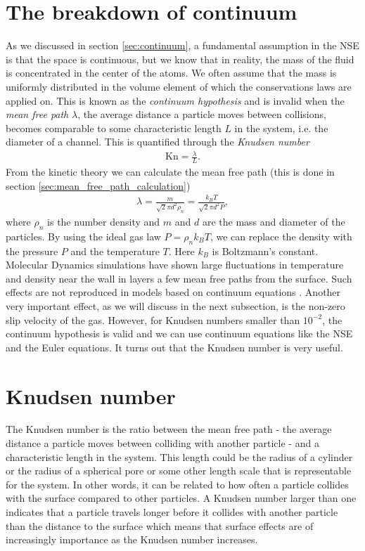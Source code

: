 \section{The breakdown of continuum}
\label{sec:continuum_breakdown}
As we discussed in section \ref{sec:continuum}, a fundamental assumption in the NSE is that the space is continuous, but we know that in reality, the mass of the fluid is concentrated in the center of the atoms. We often assume that the mass is uniformly distributed in the volume element of which the conservations laws are applied on. This is known as the \textit{continuum hypothesis} and is invalid when the \textit{mean free path} $\lambda$, the average distance a particle moves between collisions, becomes comparable to some characteristic length $L$ in the system, i.e. the diameter of a channel\cite{karniadakis2005microflows}. This is quantified through the \textit{Knudsen number}
\begin{align}
	\text{Kn} = \frac{\lambda}{L}.
\end{align}
From the kinetic theory we can calculate the mean free path (this is done in section \ref{sec:mean_free_path_calculation})
\begin{align}
	\lambda = \frac{m}{\sqrt 2 \pi d^2 \rho_n} = \frac{k_B T}{\sqrt 2 \pi d^2 P},
\end{align}
where $\rho_n$ is the number density and $m$ and $d$ are the mass and diameter of the particles. By using the ideal gas law $P = \rho_n k_BT$, we can replace the density with the pressure $P$ and the temperature $T$. Here $k_B$ is Boltzmann's constant. Molecular Dynamics simulations have shown large fluctuations in temperature and density near the wall in layers a few mean free paths from the surface. Such effects are not reproduced in models based on continuum equations \cite{karniadakis2005microflows}. Another very important effect, as we will discuss in the next subsection, is the non-zero slip velocity of the gas. However, for Knudsen numbers smaller than $10^{-2}$, the continuum hypothesis is valid and we can use continuum equations like the NSE and the Euler equations. It turns out that the Knudsen number is very useful.

\section{Knudsen number}
\label{sec:knudsen_number}
The Knudsen number is the ratio between the mean free path - the average distance a particle moves between colliding with another particle - and a characteristic length in the system. This length could be the radius of a cylinder or the radius of a spherical pore or some other length scale that is representable for the system. In other words, it can be related to how often a particle collides with the surface compared to other particles. A Knudsen number larger than one indicates that a particle travels longer before it collides with another particle than the distance to the surface which means that surface effects are of increasingly importance as the Knudsen number increases.


